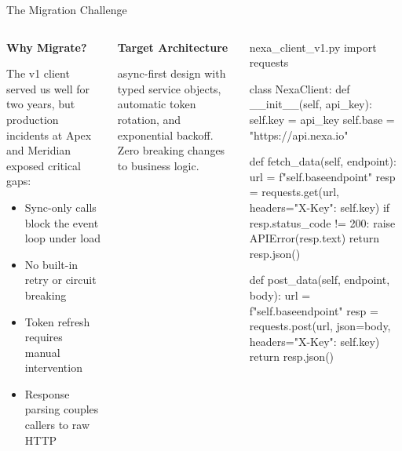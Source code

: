 \documentclass[10pt,aspectratio=169]{beamer}
\newcommand{\highlight}[1]{\textcolor{accentCyan}{#1}}
\begin{document}
\begin{frame}[fragile]{The Migration Challenge}

  \begin{columns}[T,onlytextwidth]
    \begin{infocard}
      {\large\bfseries\color{accentAmber}\faExclamationTriangle\hspace{8pt}Why Migrate?}

      \vspace{8pt}
      The v1 client served us well for two years, but production incidents at Apex and Meridian exposed critical gaps:
      \vspace{4pt}
      \begin{itemize}
        \item Sync-only calls block the event loop under load
        \item No built-in retry or circuit breaking
        \item Token refresh requires manual intervention
        \item Response parsing couples callers to raw HTTP
      \end{itemize}
    \end{infocard}

    \vspace{10pt}
    \begin{infocard}
      {\large\bfseries\color{accentCyan}\faBullseye\hspace{8pt}Target Architecture}

      \vspace{6pt}
      \highlight{async-first} design with typed service objects, automatic token rotation, and exponential backoff. Zero breaking changes to business logic.
    \end{infocard}

    \begin{codeblock}{nexa\_client\_v1.py}
import requests

class NexaClient:
    def __init__(self, api_key):
        self.key = api_key
        self.base = "https://api.nexa.io"

    def fetch_data(self, endpoint):
        url = f"{self.base}{endpoint}"
        resp = requests.get(url,
            headers={"X-Key": self.key})
        if resp.status_code != 200:
            raise APIError(resp.text)
        return resp.json()

    def post_data(self, endpoint, body):
        url = f"{self.base}{endpoint}"
        resp = requests.post(url,
            json=body,
            headers={"X-Key": self.key})
        return resp.json()
\end{codeblock}
  \end{columns}

\end{frame}
\end{document}
